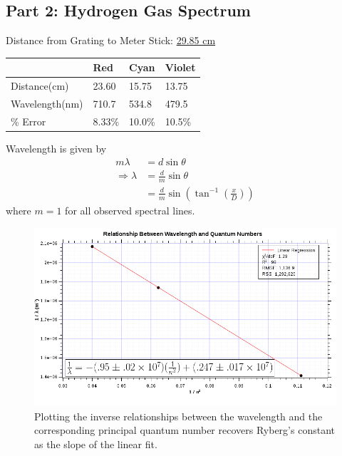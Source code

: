 \documentclass[twocolumn,english]{IEEEtran}
\theoremstyle{plain}
\theoremstyle{plain}
\begin{document}
\noindent\hrulefill


\subsection{Part 2: Hydrogen Gas Spectrum}
Distance from Grating to Meter Stick: \hfill\underline{29.85 cm}

\begin{table}[!htpb]
\centering
\begin{tabular}{@{}llll@{}}
\toprule
				& Red		& Cyan 		& Violet 		\\ \midrule
Distance(cm)   	& 23.60		& 15.75 	& 13.75    		\\
Wavelength(nm) 	& 710.7     & 534.8 	& 479.5     	\\
\% Error   		& 8.33\%    & 10.0\% 	& 10.5\%     	\\ \bottomrule
\end{tabular}
\end{table}

Wavelength is given by
\begin{align*}
	m\lambda &= d\sin\theta \\
	\Rightarrow\lambda &= \frac{d}{m}\sin\theta \\
			&= \frac{d}{m}\sin\left(\tan^{-1}\left(\frac{x}{D}\right)\right)
\end{align*}
where $m=1$ for all observed spectral lines.

\begin{figure}[h!]
	\begin{centering}
	\begin{center}
	\includegraphics[width=\linewidth]{./Images/Ryberg_graph.png}
	\caption{Plotting the inverse relationships between the wavelength and the corresponding principal quantum number recovers Ryberg's constant as the slope of the linear fit.}
	\label{fig:Ryberg_graph}
	\end{center}
	\par\end{centering}
\end{figure}
\end{document}

